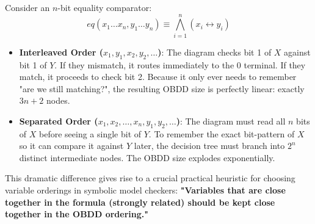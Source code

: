 \begin{example}
Consider an $n$-bit equality comparator:
\[
  eq(x_1 \dots x_n, y_1 \dots y_n) \equiv \bigwedge_{i=1}^n (x_i \leftrightarrow y_i)
\]
\begin{itemize}
    \item \textbf{Interleaved Order ($x_1, y_1, x_2, y_2, \dots$)}: The diagram checks bit 1 of $X$ against bit 1 of $Y$. If they mismatch, it routes immediately to the $0$ terminal. If they match, it proceeds to check bit 2. Because it only ever needs to remember "are we still matching?", the resulting OBDD size is perfectly linear: exactly $3n+2$ nodes.
    \item \textbf{Separated Order ($x_1, x_2, \dots, x_n, y_1, y_2, \dots$)}: The diagram must read all $n$ bits of $X$ before seeing a single bit of $Y$. To remember the exact bit-pattern of $X$ so it can compare it against $Y$ later, the decision tree must branch into $2^n$ distinct intermediate nodes. The OBDD size explodes exponentially.
\end{itemize}
This dramatic difference gives rise to a crucial practical heuristic for choosing variable orderings in symbolic model checkers: \textbf{"Variables that are close together in the formula (strongly related) should be kept close together in the OBDD ordering."}
\end{example}

